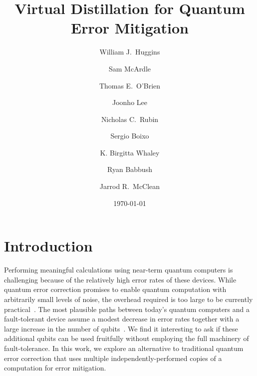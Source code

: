 \documentclass[
amsmath,
amssymb,
aps,
pra,
reprint,
twocolumn,
superscriptaddress,
longbibliography,
showkeys,
floatfix
]{revtex4-1}
\begin{document}
\title{Virtual Distillation for Quantum Error Mitigation}

\author{William J.~Huggins}
\author{Sam McArdle}
\author{Thomas E.~O'Brien}
\author{Joonho Lee}
\author{Nicholas C.~Rubin}
\author{Sergio Boixo}
\author{K. Birgitta Whaley}
\author{Ryan Babbush}
\author{Jarrod R.~McClean}

\date{\today}



\maketitle



\section{Introduction}

Performing meaningful calculations using near-term quantum computers is
challenging because of the relatively high error rates of these devices.
While quantum error correction promises to enable quantum computation with
arbitrarily small levels of noise, the overhead required is too large to be
currently practical~\cite{Aharonov1997-be, Fowler2012-li}. 
The most plausible paths between today's quantum computers and a fault-tolerant
device assume a modest decrease in error rates together with a large increase in
the number of qubits~\cite{Fowler2012-li, Preskill2018-po}.
We find it interesting to ask if these additional qubits can be used fruitfully
without employing the full machinery of fault-tolerance.
In this work, we explore an alternative to traditional quantum error correction
that uses multiple independently-performed copies of a computation for error
mitigation.
\end{document}

